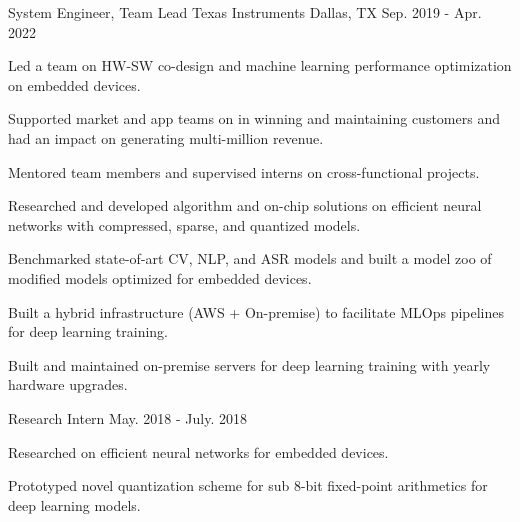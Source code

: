 \begin{cventries}
\cventry
{System Engineer, Team Lead} %
{Texas Instruments} %
{Dallas, TX} %
{Sep. 2019 - Apr. 2022} %
{
		\begin{cvitems} %
			\item {Led a team on HW-SW co-design and machine learning performance optimization on embedded devices.}
			\item {Supported market and app teams on in winning and maintaining customers and had an impact on generating multi-million revenue.}
			\item {Mentored team members and supervised interns on cross-functional projects.}
			\item {Researched and developed algorithm and on-chip solutions on efficient neural networks with compressed, sparse, and quantized models.}
			\item {Benchmarked state-of-art CV, NLP, and ASR models and built a model zoo of modified models optimized for embedded devices.}
			\item {Built a hybrid infrastructure (AWS + On-premise) to facilitate MLOps pipelines for deep learning training.}
			\item {Built and maintained on-premise servers for deep learning training with yearly hardware upgrades.}
		\end{cvitems}
}

\cventry
{Research Intern} %
{} %
{} %
{May. 2018 - July. 2018} %
{
		\begin{cvitems} %
				\item {Researched on efficient neural networks for embedded devices.}
				\item {Prototyped novel quantization scheme for sub 8-bit fixed-point arithmetics for deep learning models.}
		\end{cvitems}
}


\end{cventries}
